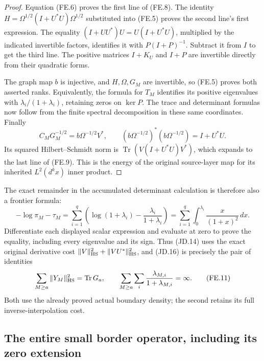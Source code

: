 \begin{proof}
Equation (FE.6) proves the first line of (FE.8).  The identity
\(H=\Omega^{1/2}(I+U^*U)\Omega^{1/2}\) substituted into
(FE.5) proves the second line's first expression.  The equality
\((I+UU^*)U=U(I+U^*U)\), multiplied by the indicated
invertible factors, identifies it with \(P(I+P)^{-1}\).
Subtract it from \(I\) to get the third line.  The positive
matrices \(I+K_U\) and \(I+P\) are invertible directly from
their quadratic forms.

The graph map \(b\) is injective, and \(H,\Omega,G_M\)
are invertible, so (FE.5) proves both asserted ranks.  Equivalently,
the formula for \(T_M\) identifies its positive eigenvalues
with \(\lambda_i/(1+\lambda_i)\), retaining zeros on
\(\ker P\).  The trace and determinant formulas now follow
from the finite spectral decomposition in these same coordinates.
Finally
\[
 C_MG_M^{-1/2}=b\Omega^{-1/2}V^*,\qquad
 (b\Omega^{-1/2})^*(b\Omega^{-1/2})=I+U^*U.
\]
Its squared Hilbert--Schmidt norm is
\(\operatorname{Tr}(V(I+U^*U)V^*)\), which expands to
the last line of (FE.9).  This is the energy of the original
source-layer map for its inherited \(L^2(d^kx)\) inner product.
\end{proof}

The exact remainder in the accumulated determinant calculation is
therefore also a frontier formula:
\[
 -\log\pi_M-\tau_M
   =\sum_{i=1}^q\left(\log(1+\lambda_i)
                       -\frac{\lambda_i}{1+\lambda_i}\right)
   =\sum_{i=1}^q\int_0^{\lambda_i}\frac{x}{(1+x)^2}\,dx.
 \tag{FE.10}
\]
Differentiate each displayed scalar expression and evaluate at zero
to prove the equality, including every eigenvalue and its sign.
Thus (JD.14) uses the exact original derivative cost
\(\|V\|_{\rm HS}^2+\|VU^*\|_{\rm HS}^2\), and
(JD.16) is precisely the pair of identities
\[
 \sum_{M\ge a}\|Y_M\|_{\rm HS}^2=\operatorname{Tr}G_a,
 \qquad
 \sum_{M\ge a}\sum_i\frac{\lambda_{M,i}}{1+\lambda_{M,i}}
                  =\infty.                             \tag{FE.11}
\]
Both use the already proved actual boundary density; the second
retains its full inverse-interpolation cost.

\subsection{The entire small border operator, including its zero extension}

